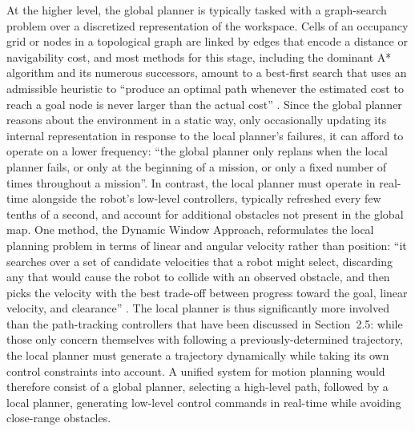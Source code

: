 At the higher level, the global planner is typically tasked with a graph-search problem over a discretized representation of the workspace. Cells of an occupancy grid or nodes in a topological graph are linked by edges that encode a distance or navigability cost, and most methods for this stage, including the dominant A* algorithm and its numerous successors, amount to a best-first search that uses an admissible heuristic to ``produce an optimal path whenever the estimated cost to reach a goal node is never larger than the actual cost'' \cite{hart1968formal}. Since the global planner reasons about the environment in a static way, only occasionally updating its internal representation in response to the local planner's failures, it can afford to operate on a lower frequency: ``the global planner only replans when the local planner fails, or only at the beginning of a mission, or only a fixed number of times throughout a mission''. In contrast, the local planner must operate in real-time alongside the robot's low-level controllers, typically refreshed every few tenths of a second, and account for additional obstacles not present in the global map. One method, the Dynamic Window Approach, reformulates the local planning problem in terms of linear and angular velocity rather than position: ``it searches over a set of candidate velocities that a robot might select, discarding any that would cause the robot to collide with an observed obstacle, and then picks the velocity with the best trade-off between progress toward the goal, linear velocity, and clearance'' \cite{fox1997dynamic}. The local planner is thus significantly more involved than the path-tracking controllers that have been discussed in Section~2.5: while those only concern themselves with following a previously-determined trajectory, the local planner must generate a trajectory dynamically while taking its own control constraints into account. A unified system for motion planning would therefore consist of a global planner, selecting a high-level path, followed by a local planner, generating low-level control commands in real-time while avoiding close-range obstacles.

